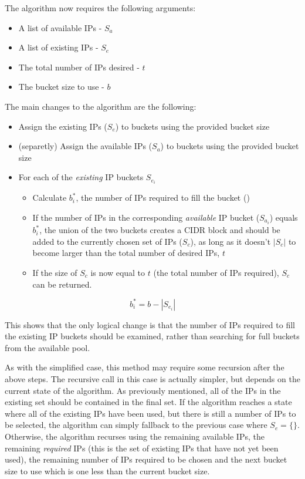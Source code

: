 The algorithm now requires the following arguments:

\begin{itemize}
\item{A list of available IPs - $S_a$}
\item{A list of existing IPs - $S_e$}
\item{The total number of IPs desired - $t$}
\item{The bucket size to use - $b$}
\end{itemize}

The main changes to the algorithm are the following:

\begin{itemize}
  \item{Assign the existing IPs ($S_e$) to buckets using the provided bucket size}
  \item{(separetly) Assign the available IPs ($S_a$) to buckets using the provided bucket size}
  \item{For each of the \textit{existing} IP buckets $S_{e_i}$}
      \begin{itemize}
      \item{Calculate $b^*_i$, the number of IPs required to fill the bucket ()}
      \item{If the number of IPs in the corresponding \textit{available} IP bucket ($S_{a_i}$) equals $b^*_i$, the union of the two buckets creates a CIDR block and should be added to the currently chosen set of IPs ($S_c$), as long as it doesn't $|S_c|$ to become larger than the total number of desired IPs, $t$}
      \item{If the size of $S_c$ is now equal to $t$ (the total number of IPs required), $S_c$ can be returned.}
      \end{itemize}
\end{itemize}


\begin{equation}\label{eq:ipsToFillBucket}
b^*_i= b-|S_{e_i}|
\end{equation}


This shows that the only logical change is that the number of IPs required to fill the existing IP buckets should be examined, rather than searching for full buckets from the available pool. 

As with the simplified case, this method may require some recursion after the above steps. The recursive call in this case is actually simpler, but depends on the current state of the algorithm. As previously mentioned, all of the IPs in the existing set should be contained in the final set. If the algorithm reaches a state where all of the existing IPs have been used, but there is still a number of IPs to be selected, the algorithm can simply fallback to the previous case where $S_e = \{\}$. Otherwise, the algorithm recurses using the remaining available IPs, the remaining \textit{required} IPs (this is the set of existing IPs that have not yet been used), the remaining number of IPs required to be chosen and the next bucket size to use which is one less than the current bucket size.

